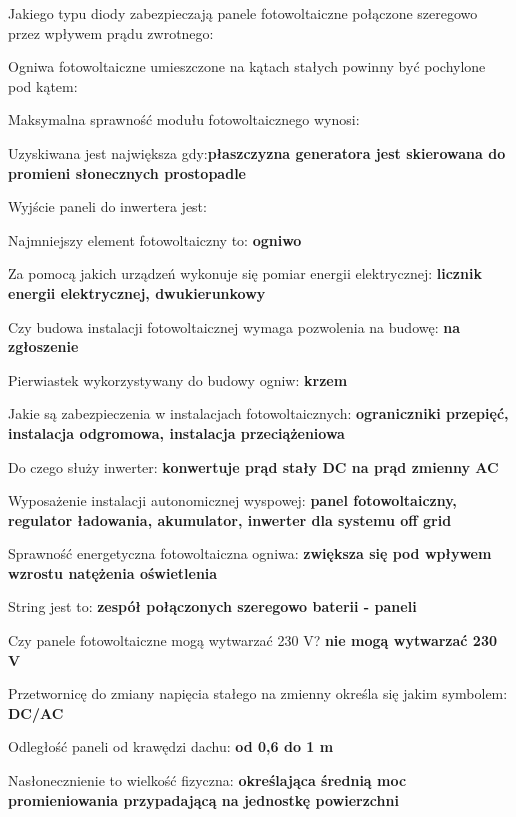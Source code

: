 \documentclass[12pt,a4paper]{article}
\begin{document}
Jakiego typu diody zabezpieczają panele fotowoltaiczne połączone szeregowo przez wpływem prądu zwrotnego: \textbf{}

Ogniwa fotowoltaiczne umieszczone na kątach stałych powinny być pochylone  pod kątem: \textbf{}

Maksymalna sprawność modułu fotowoltaicznego wynosi: \textbf{}

Uzyskiwana \textbf{} jest największa gdy:\textbf{płaszczyzna generatora jest skierowana do promieni słonecznych prostopadle}

Wyjście paneli do inwertera jest:  \textbf{} 

Najmniejszy element fotowoltaiczny to: \textbf{ogniwo}

Za pomocą jakich urządzeń wykonuje się pomiar energii elektrycznej: \textbf{licznik energii elektrycznej, dwukierunkowy}

Czy budowa instalacji fotowoltaicznej wymaga pozwolenia na budowę:  \textbf{na zgłoszenie}

Pierwiastek wykorzystywany do budowy ogniw: \textbf{krzem}

Jakie są zabezpieczenia w instalacjach fotowoltaicznych: \textbf{ograniczniki przepięć, instalacja odgromowa, instalacja przeciążeniowa}

Do czego służy inwerter: \textbf{konwertuje prąd stały DC na prąd zmienny AC}

Wyposażenie instalacji  autonomicznej wyspowej: \textbf{panel fotowoltaiczny, regulator ładowania, akumulator, inwerter dla systemu off grid}

Sprawność energetyczna fotowoltaiczna ogniwa: \textbf{zwiększa się pod wpływem wzrostu natężenia oświetlenia}

String jest to: \textbf{zespół połączonych szeregowo baterii - paneli}

Czy panele fotowoltaiczne mogą wytwarzać 230 V? \textbf{nie mogą wytwarzać 230 V}

Przetwornicę do zmiany napięcia stałego na zmienny określa się jakim symbolem: \textbf{DC/AC}

Odległość paneli od krawędzi dachu: \textbf{od 0,6 do 1 m}

Nasłonecznienie to wielkość fizyczna: \textbf{określająca średnią moc promieniowania przypadającą na jednostkę powierzchni}
\end{document}
